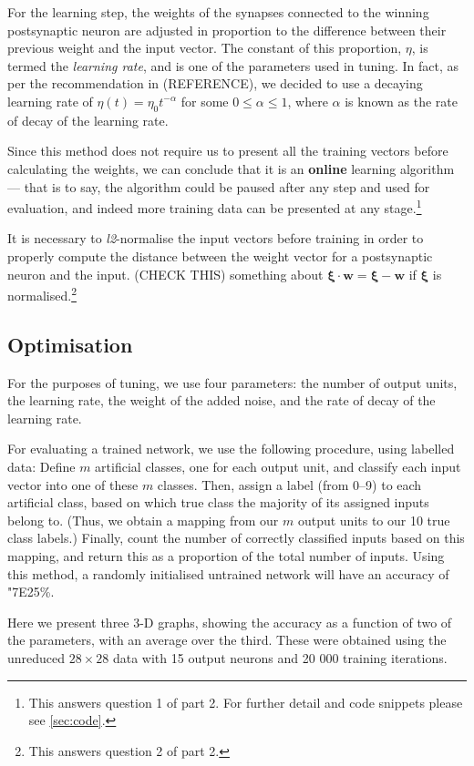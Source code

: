 \documentclass[a4paper, 11pt, twocolumn, draft]{article} %
\begin{document}
For the learning step, the weights of the synapses connected to the winning
postsynaptic neuron are adjusted in proportion to the difference between their
previous weight and the input vector.  The constant of this proportion, $\eta$,
is termed the \textit{learning rate}, and is one of the parameters used in
tuning.  In fact, as per the recommendation in (REFERENCE), we decided to use a
decaying learning rate of $\eta(t) = \eta_0t^{-\alpha}$ for some $0 \le \alpha
\le 1$, where $\alpha$ is known as the rate of decay of the learning rate.

Since this method does not require us to present all the training vectors before
calculating the weights, we can conclude that it is an \textbf{online} learning
algorithm --- that is to say, the algorithm could be paused after any step and
used for evaluation, and indeed more training data can be presented at any
stage.\footnote{This answers question 1 of part 2.  For further detail and code
snippets please see \autoref{sec:code}.}

It is necessary to \textit{l2}-normalise the input vectors before training in
order to properly compute the distance between the weight vector for a
postsynaptic neuron and the input.  (CHECK THIS) something about
$\bm{\xi}\cdot\bm{w} = \bm{\xi} - \bm{w}$ if $\bm{\xi}$ is
normalised.\footnote{This answers question 2 of part 2.}

\subsection{Optimisation}

For the purposes of tuning, we use four parameters: the number of output units,
the learning rate, the weight of the added noise, and the rate of decay of the
learning rate.

For evaluating a trained network, we use the following procedure, using labelled
data:  Define $m$ artificial classes, one for each output unit, and classify
each input vector into one of these $m$ classes.  Then, assign a label (from
0--9) to each artificial class, based on which true class the majority of its
assigned inputs belong to.  (Thus, we obtain a mapping from our $m$ output units
to our 10 true class labels.)  Finally, count the number of correctly classified
inputs based on this mapping, and return this as a proportion of the total
number of inputs.  Using this method, a randomly initialised untrained network
will have an accuracy of \char"7E{}25\%.

Here we present three 3-D graphs, showing the accuracy as a function of two of
the parameters, with an average over the third.  These were obtained using the
unreduced $28 \times 28$ data with 15 output neurons and 20 000 training
iterations.
\end{document}
